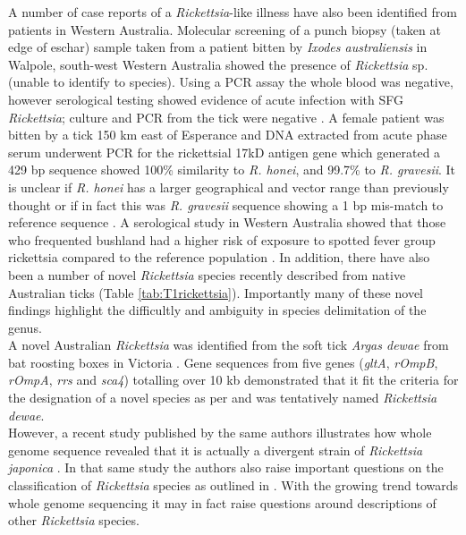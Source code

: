 \documentclass[a4paper, nobind]{templates/ociamthesis}
\begin{document}
A number of case reports of a \emph{Rickettsia}-like illness have also been identified from patients in Western Australia.
Molecular screening of a punch biopsy (taken at edge of eschar) sample taken from a patient bitten by \emph{Ixodes australiensis} in Walpole, south-west Western Australia showed the presence of \emph{Rickettsia} sp. (unable to identify to species).
Using a PCR assay the whole blood was negative, however serological testing showed evidence of acute infection with SFG \emph{Rickettsia}; culture and PCR from the tick were negative \autocite{rabyNewFociSpotted2016}.
A female patient was bitten by a tick 150 km east of Esperance and DNA extracted from acute phase serum underwent PCR for the rickettsial 17kD antigen gene which generated a 429 bp sequence showed 100\% similarity to \emph{R. honei}, and 99.7\% to \emph{R. gravesii}.
It is unclear if \emph{R. honei} has a larger geographical and vector range than previously thought or if in fact this was \emph{R. gravesii} sequence showing a 1 bp mis-match to reference sequence \autocite{rabyNewFociSpotted2016}.
A serological study in Western Australia showed that those who frequented bushland had a higher risk of exposure to spotted fever group rickettsia compared to the reference population \autocite{abdadSeroepidemiologicalStudyOutdoor2014}.
In addition, there have also been a number of novel \emph{Rickettsia} species recently described from native Australian ticks (Table \ref{tab:T1rickettsia}).
Importantly many of these novel findings highlight the difficultly and ambiguity in species delimitation of the genus.\\
A novel Australian \emph{Rickettsia} was identified from the soft tick \emph{Argas dewae} from bat roosting boxes in Victoria \autocite{izzardRickettsialesRickettsialDiseases2010}.
Gene sequences from five genes (\emph{gltA}, \emph{rOmpB}, \emph{rOmpA}, \emph{rrs} and \emph{sca4}) totalling over 10 kb demonstrated that it fit the criteria for the designation of a novel species as per \textcite{fournierGeneSequenceBasedCriteria2003} and was tentatively named \emph{Rickettsia dewae}.\\
However, a recent study published by the same authors illustrates how whole genome sequence revealed that it is actually a divergent strain of \emph{Rickettsia japonica} \autocite{izzardIsolationDivergentStrain2018}.
In that same study the authors also raise important questions on the classification of \emph{Rickettsia} species as outlined in \textcite{fournierGeneSequenceBasedCriteria2003}.
With the growing trend towards whole genome sequencing it may in fact raise questions around descriptions of other \emph{Rickettsia} species.
\end{document}
